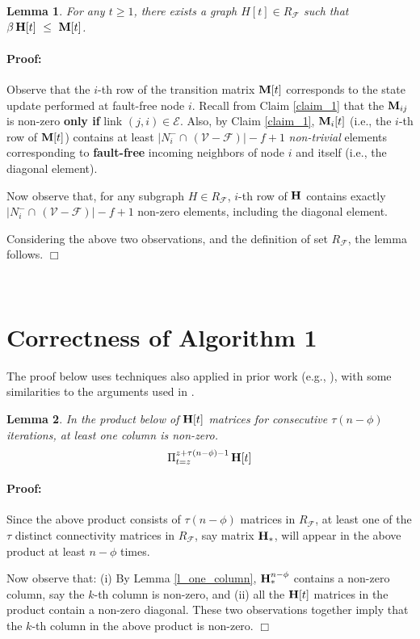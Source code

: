\documentclass[letterpaper, 12pt]{article}
\newenvironment{proof}{\paragraph{\bf Proof:}}{\hspace*{\fill}\(\Box\)}
\newcommand{\scriptf}{\mathcal{F}}
\newcommand{\scripte}{\mathcal{E}}
\newcommand{\scriptv}{\mathcal{V}}
\newtheorem{lemma}{Lemma}
\begin{document}
\begin{lemma}
\label{l_H}
For any $t\geq 1$, there exists a graph $H[t]\in R_\scriptf$ such that
$\beta \, {\bf H}[t] ~ \leq ~  {{\bf M}[t]}$.
\end{lemma}
\begin{proof}
Observe that the $i$-th row of the transition matrix ${\bf M}[t]$ corresponds to the state update
performed at fault-free node $i$. Recall from Claim \ref{claim_1} that
the ${\bf M}_{ij}$ is non-zero {\bf only if} link $(j,i)\in\scripte$.
Also, by Claim \ref{claim_1},
${\bf M}_i[t]$ (i.e., the $i$-th row of ${\bf M}[t]$)
contains at least $|N_i^-\cap\,(\scriptv-\scriptf)| - f+1$
{\em non-trivial} elements corresponding
to {\bf fault-free} incoming neighbors of node $i$ and itself (i.e., the
diagonal element).

Now observe that, for any subgraph $H\in R_\scriptf$, $i$-th row of 
${\bf H}$ contains exactly $|N_i^-\cap\,(\scriptv-\scriptf)| - f+1$ non-zero elements,
including the diagonal element.

Considering the above two observations, and the definition of set $R_\scriptf$,
the lemma follows.
\end{proof}

~

\section{Correctness of Algorithm 1}


The proof below uses techniques also applied in prior work
(e.g., \cite{jadbabaie_consensus,Benezit,vaidyaII,Zhang}),
with some similarities to the arguments used in \cite{vaidyaII,Zhang}.

\begin{lemma}
\label{l_product_H}
In the product below of ${\bf H}[t]$ matrices for consecutive
$\tau(n-\phi)$ iterations, at least one column is non-zero. 
\[
\Pi_{t=z}^{z+\tau(n-\phi)-1} \, {\bf H}[t]
\]
\end{lemma}
\begin{proof}
Since the above product consists of $\tau(n-\phi)$ matrices
in $R_\scriptf$,
at least one of the $\tau$ distinct connectivity matrices
in $R_\scriptf$, say matrix ${\bf H}_*$, will appear in the above
product at least $n-\phi$ times.

Now observe that: (i)
By Lemma \ref{l_one_column}, ${\bf H}_*^{n-\phi}$ contains a non-zero
column, say the $k$-th column is non-zero,
and (ii) all the ${\bf H}[t]$ matrices in the product contain a non-zero diagonal.
These two observations together imply that the $k$-th column in the above product 
is non-zero.
\end{proof}
\end{document}
